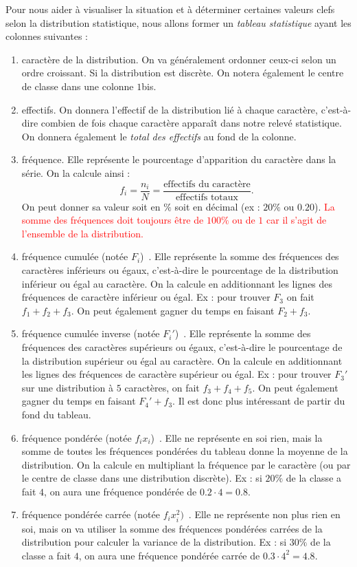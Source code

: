 Pour nous aider à visualiser la situation et à déterminer certaines valeurs clefs selon la distribution statistique, nous allons former un \emph{tableau statistique} ayant les colonnes suivantes :
\begin{enumerate}[colonne 1 : ]
\item caractère de la distribution. On va généralement ordonner ceux-ci selon un ordre croissant. Si la distribution est discrète. On notera également le centre de classe dans une colonne $1$bis.
\item effectifs. On donnera l'effectif de la distribution lié à chaque caractère, c'est-à-dire combien de fois chaque caractère apparaît dans notre relevé statistique. On donnera également le \emph{total des effectifs} au fond de la colonne.
\item fréquence. Elle représente le pourcentage d'apparition du caractère dans la série. On la calcule ainsi :
$$
f_i = \frac{n_i}{N} = \frac{\mbox{effectifs du caractère}}{\mbox{effectifs totaux}}.
$$
On peut donner sa valeur soit en $\%$ soit en décimal (ex : $20\%$ ou $0.20$). \textcolor{red}{La somme des fréquences doit toujours être de $100\%$ ou de $1$ car il s'agit de l'ensemble de la distribution.}
\item fréquence cumulée (notée $F_i$)~. Elle représente la somme des fréquences des caractères inférieurs ou égaux, c'est-à-dire le pourcentage de la distribution inférieur ou égal au caractère. On la calcule en additionnant les lignes des fréquences de caractère inférieur ou égal. Ex : pour trouver $F_3$ on fait $f_1 + f_2 + f_3$. On peut également gagner du temps en faisant $F_2 + f_3$.
\item fréquence cumulée inverse (notée $F_i'$)~. Elle représente la somme des fréquences des caractères supérieurs ou égaux, c'est-à-dire le pourcentage de la distribution supérieur ou égal au caractère. On la calcule en additionnant les lignes des fréquences de caractère supérieur ou égal. Ex : pour trouver $F_3'$ sur une distribution à $5$ caractères, on fait $f_3 + f_4 + f_5$. On peut également gagner du temps en faisant $F_4' + f_3$. Il est donc plus intéressant de partir du fond du tableau.
\item fréquence pondérée (notée $f_ix_i$)~. Elle ne représente en soi rien, mais la somme de toutes les fréquences pondérées du tableau donne la moyenne de la distribution. On la calcule en multipliant la fréquence par le caractère (ou par le centre de classe dans une distribution discrète). Ex : si $20\%$ de la classe a fait $4$, on aura une fréquence pondérée de $0.2 \cdot 4 = 0.8$.
\item fréquence pondérée carrée (notée $f_i x_i^2)$~. Elle ne représente non plus rien en soi, mais on va utiliser la somme des fréquences pondérées carrées de la distribution pour calculer la variance de la distribution. Ex : si $30\%$ de la classe a fait $4$, on aura une fréquence pondérée carrée de $0.3 \cdot 4^2 = 4.8$.
\end{enumerate}

